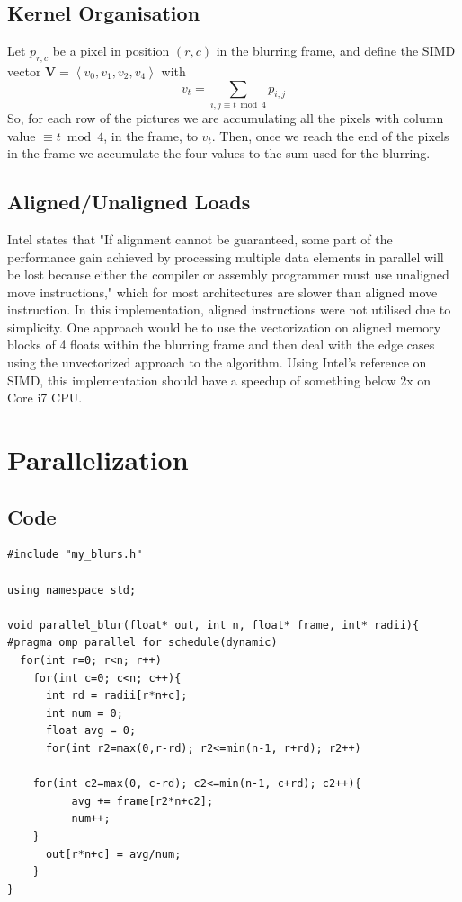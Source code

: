 \documentclass[11pt,letter]{article}
\begin{document}
\subsection{Kernel Organisation}
Let $p_{r, c}$ be  a pixel in position $(r, c)$  in the blurring frame, and define the SIMD vector $\mathbf{V} = \left< v_0, v_1, v_2, v_4\right>$ with $$v_t = \sum_{i, j \equiv t \bmod 4} p_{i, j}$$
So, for each row of the pictures we are accumulating all the pixels with column value $ \equiv t \bmod 4$, in the frame, to $v_t$. Then, once we reach the end of the pixels in the frame we accumulate the four values to the sum used for the blurring. 
\subsection{Aligned/Unaligned Loads}
Intel states that "If alignment cannot be guaranteed, some part of the performance gain achieved by processing multiple data elements in parallel will be lost because either the compiler or assembly programmer must use unaligned move instructions," which for most architectures are slower than aligned move instruction. In this implementation, aligned instructions were not utilised due to simplicity. One approach would be to use the vectorization on aligned memory blocks of 4 floats within the blurring frame and then deal with the edge cases using the unvectorized approach to the algorithm. Using Intel's reference on SIMD, this implementation should have a speedup of something below 2x on Core i7 CPU.

\section{Parallelization}
\subsection{Code}
\begin{lstlisting}[label=some-code,caption=parallel\_blur.cpp]
#include "my_blurs.h"

using namespace std;

void parallel_blur(float* out, int n, float* frame, int* radii){
#pragma omp parallel for schedule(dynamic)
  for(int r=0; r<n; r++)
    for(int c=0; c<n; c++){
      int rd = radii[r*n+c];
      int num = 0;
      float avg = 0;
      for(int r2=max(0,r-rd); r2<=min(n-1, r+rd); r2++)

	for(int c2=max(0, c-rd); c2<=min(n-1, c+rd); c2++){
          avg += frame[r2*n+c2];
          num++;
	}
      out[r*n+c] = avg/num;
    }
}

\end{lstlisting}
\pagebreak
\end{document}
